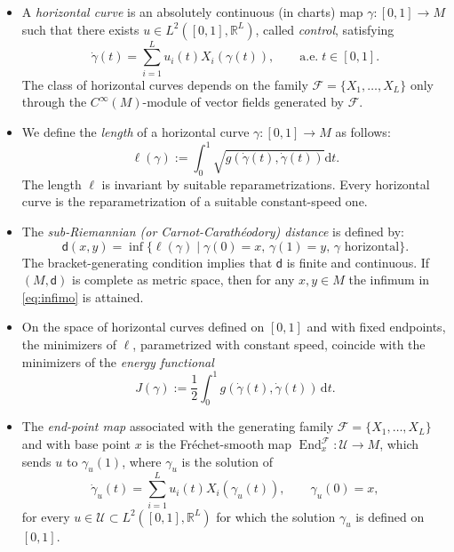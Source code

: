 \documentclass[11pt,a4paper]{article}
\theoremstyle{plain}
\theoremstyle{definition}
\theoremstyle{remark}
\numberwithin{equation}{section}
\newcommand{\R}{\mathbb{R}} %
\DeclareMathOperator{\End}{\mathrm{End}}
\newcommand{\di}{\mathrm{d}}
\newcommand{\sfd}{\mathsf d}
\begin{document}
\begin{itemize}
\item A \emph{horizontal curve} is an absolutely continuous (in charts) map $\gamma : [0,1] \to M$ such that there exists $u\in L^{2}([0,1],
\R^{L})$, called \emph{control}, satisfying
\begin{equation}\label{eq:admissible}
\dot\gamma(t) =  \sum_{i=1}^L u_i(t) X_i(\gamma(t)), \qquad \mathrm{a.e. }\; t \in [0,1].
\end{equation}
The class of horizontal curves depends on the family $\mathscr{F}=\{X_1,\dots,X_L\}$ only through the $C^{\infty}(M)$-module of vector fields generated by $\mathscr{F}$.
\item We define the \emph{length} of a horizontal curve $\gamma:[0,1]\to M$ as follows:
\begin{equation}
\ell(\gamma) := \int_0^1 \sqrt{g(\dot\gamma(t),\dot\gamma(t))}\di t.
\end{equation}
The length $\ell$ is invariant by suitable reparametrizations. Every horizontal curve is the reparametrization of a suitable constant-speed one.
\item The \emph{sub-Rieman\-nian (or Carnot-Carathéodory) distance} is defined by:
\begin{equation}\label{eq:infimo}
\sfd(x,y) = \inf\{\ell(\gamma)\mid \gamma(0) = x,\, \gamma(1) = y,\, \gamma \text{ horizontal} \}.
\end{equation}
The bracket-generating condition implies that $\sfd$ is finite and continuous. If $(M,\sfd)$ is complete as metric space, then for any $x,y \in M$ the infimum in \eqref{eq:infimo} is attained.

\item
On the space of horizontal curves defined on $[0,1]$ and with fixed endpoints, the minimizers of $\ell$, parametrized with constant speed, coincide with the minimizers of the \emph{energy functional} 
\begin{equation}
J(\gamma) := \frac{1}{2}\int_0^1 g(\dot\gamma(t),\dot\gamma(t))\, \di t.
\end{equation}

\item 
The \emph{end-point map} associated with the generating family $\mathscr{F}=\{X_{1},\ldots,X_{L}\}$ and with base point $x$ is the Fréchet-smooth map $\End^{\mathscr{F}}_{x}: \mathcal{U} \to M$, which sends $u$ to $\gamma_u(1)$, where $\gamma_u$ is the solution of
\begin{equation}\label{eq:endpoints}
\dot\gamma_u(t) = \sum_{i=1}^L u_i(t) X_i(\gamma_u(t)), \qquad \gamma_u(0) = x,
\end{equation}
for every $u\in \mathcal{U} \subset L^2([0,1],\R^L)$ for which the solution $\gamma_u$ is defined on $[0,1]$.



\end{itemize}
\end{document}
